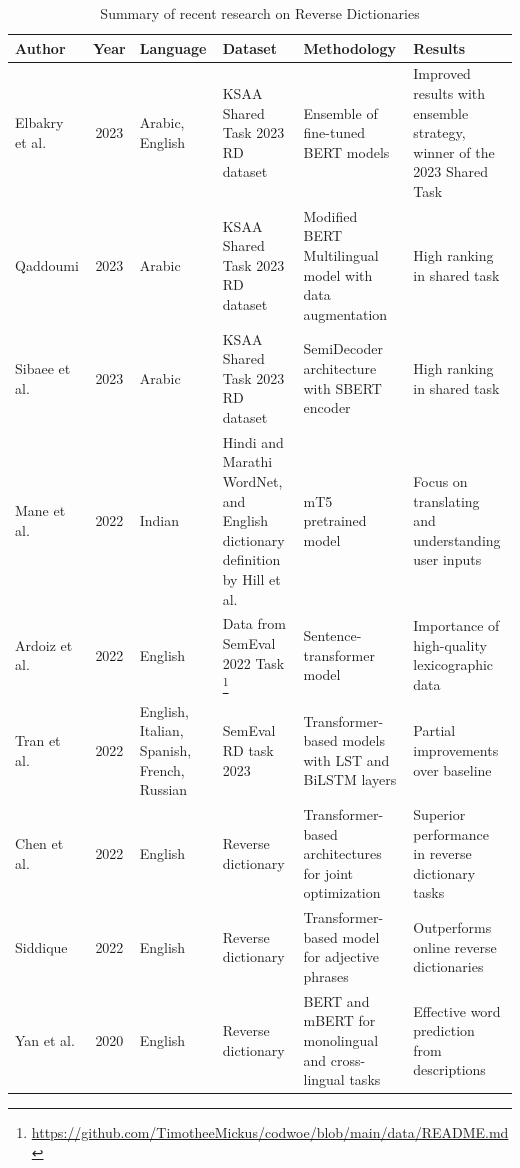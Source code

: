\documentclass[15pt]{article}
\begin{document}
\begin{table}
    \centering
    \caption{Summary of recent research on Reverse Dictionaries}
     \renewcommand{\arraystretch}{1.5}%
    \begin{tabularx}{\textwidth}{|l|c|X|X|X|X|}
        \hline
        \textbf{Author} & \textbf{Year} &  \textbf{Language} & \textbf{Dataset} & \textbf{Methodology} & \textbf{Results} \\
        \hline
        Elbakry et al. \cite{Albakry2023} & 2023 & Arabic, English & KSAA Shared Task 2023 RD dataset & Ensemble of fine-tuned BERT models & Improved results with ensemble strategy, winner of the 2023 Shared Task \\
        \hline
        Qaddoumi \cite{Qaddoumi2023} & 2023 & Arabic & KSAA Shared Task 2023 RD dataset & Modified BERT Multilingual model with data augmentation & High ranking in shared task \\
        \hline
        Sibaee et al. \cite{Sibaee2023} & 2023 & Arabic & KSAA Shared Task 2023 RD dataset & SemiDecoder architecture with SBERT encoder & High ranking in shared task \\
        \hline
        Mane et al. \cite{Mane2022} & 2022 & Indian & Hindi and Marathi WordNet, and English dictionary deﬁnition by Hill et al. \cite{Hill2016} & mT5 pretrained model & Focus on translating and understanding user inputs \\
        \hline
        Ardoiz et al. \cite{Ardoiz2022} & 2022 & English & Data from SemEval 2022 Task \footnote{\href{https://github.com/TimotheeMickus/codwoe/blob/main/data/README.md}{https://github.com/TimotheeMickus/codwoe/blob/main/data/README.md}} & Sentence-transformer model & Importance of high-quality lexicographic data \\
        \hline
        Tran et al.\cite{Tran2022} & 2022 & English, Italian, Spanish, French, Russian & SemEval RD task 2023 & Transformer-based models with LST and BiLSTM layers & Partial improvements over baseline \\
        \hline
        Chen et al. \cite{Chen2022} & 2022 & English & Reverse dictionary & Transformer-based architectures for joint optimization & Superior performance in reverse dictionary tasks \\
        \hline
        Siddique \cite{Siddique2022} & 2022 & English & Reverse dictionary & Transformer-based model for adjective phrases & Outperforms online reverse dictionaries \\
        \hline
        Yan et al. \cite{Yan2020} & 2020 & English & Reverse dictionary & BERT and mBERT for monolingual and cross-lingual tasks & Effective word prediction from descriptions \\

\end{tabularx}
\end{table}
\end{document}
